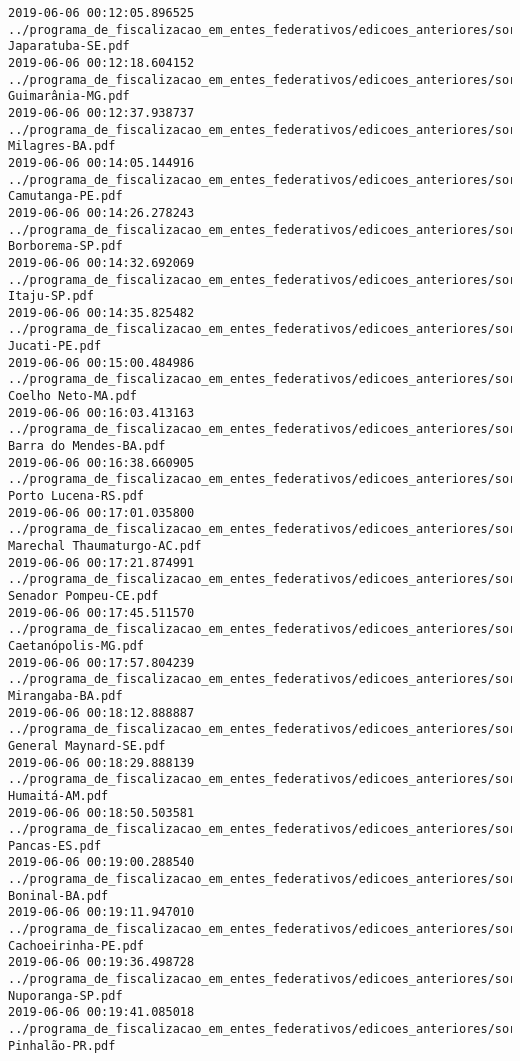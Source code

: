 \begin{lstlisting}
2019-06-06 00:12:05.896525 ../programa_de_fiscalizacao_em_entes_federativos/edicoes_anteriores/sorteio_39/3224-Japaratuba-SE.pdf
2019-06-06 00:12:18.604152 ../programa_de_fiscalizacao_em_entes_federativos/edicoes_anteriores/sorteio_39/3162-Guimarânia-MG.pdf
2019-06-06 00:12:37.938737 ../programa_de_fiscalizacao_em_entes_federativos/edicoes_anteriores/sorteio_39/3132-Milagres-BA.pdf
2019-06-06 00:14:05.144916 ../programa_de_fiscalizacao_em_entes_federativos/edicoes_anteriores/sorteio_39/3184-Camutanga-PE.pdf
2019-06-06 00:14:26.278243 ../programa_de_fiscalizacao_em_entes_federativos/edicoes_anteriores/sorteio_39/3228-Borborema-SP.pdf
2019-06-06 00:14:32.692069 ../programa_de_fiscalizacao_em_entes_federativos/edicoes_anteriores/sorteio_39/3230-Itaju-SP.pdf
2019-06-06 00:14:35.825482 ../programa_de_fiscalizacao_em_entes_federativos/edicoes_anteriores/sorteio_39/3186-Jucati-PE.pdf
2019-06-06 00:15:00.484986 ../programa_de_fiscalizacao_em_entes_federativos/edicoes_anteriores/sorteio_39/3154-Coelho Neto-MA.pdf
2019-06-06 00:16:03.413163 ../programa_de_fiscalizacao_em_entes_federativos/edicoes_anteriores/sorteio_39/3126-Barra do Mendes-BA.pdf
2019-06-06 00:16:38.660905 ../programa_de_fiscalizacao_em_entes_federativos/edicoes_anteriores/sorteio_39/3214-Porto Lucena-RS.pdf
2019-06-06 00:17:01.035800 ../programa_de_fiscalizacao_em_entes_federativos/edicoes_anteriores/sorteio_39/3122-Marechal Thaumaturgo-AC.pdf
2019-06-06 00:17:21.874991 ../programa_de_fiscalizacao_em_entes_federativos/edicoes_anteriores/sorteio_39/3142-Senador Pompeu-CE.pdf
2019-06-06 00:17:45.511570 ../programa_de_fiscalizacao_em_entes_federativos/edicoes_anteriores/sorteio_39/3156-Caetanópolis-MG.pdf
2019-06-06 00:17:57.804239 ../programa_de_fiscalizacao_em_entes_federativos/edicoes_anteriores/sorteio_39/3134-Mirangaba-BA.pdf
2019-06-06 00:18:12.888887 ../programa_de_fiscalizacao_em_entes_federativos/edicoes_anteriores/sorteio_40/3382-General Maynard-SE.pdf
2019-06-06 00:18:29.888139 ../programa_de_fiscalizacao_em_entes_federativos/edicoes_anteriores/sorteio_40/3376-Humaitá-AM.pdf
2019-06-06 00:18:50.503581 ../programa_de_fiscalizacao_em_entes_federativos/edicoes_anteriores/sorteio_40/3384-Pancas-ES.pdf
2019-06-06 00:19:00.288540 ../programa_de_fiscalizacao_em_entes_federativos/edicoes_anteriores/sorteio_40/3332-Boninal-BA.pdf
2019-06-06 00:19:11.947010 ../programa_de_fiscalizacao_em_entes_federativos/edicoes_anteriores/sorteio_40/3415-Cachoeirinha-PE.pdf
2019-06-06 00:19:36.498728 ../programa_de_fiscalizacao_em_entes_federativos/edicoes_anteriores/sorteio_40/3346-Nuporanga-SP.pdf
2019-06-06 00:19:41.085018 ../programa_de_fiscalizacao_em_entes_federativos/edicoes_anteriores/sorteio_40/3324-Pinhalão-PR.pdf

\end{lstlisting}
